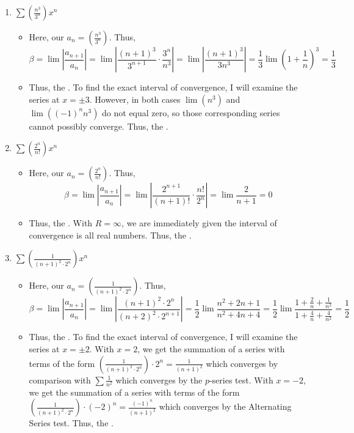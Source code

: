 \documentclass[10pt,a4paper]{article}
\theoremstyle{definition}
\begin{document}
\begin{enumerate}[label = (\alph*)]
\begin{itemize}
	\end{itemize}
\item $\displaystyle \sum \left(\frac{n^3}{3^n}\right)x^n$
	\begin{itemize}
	\item Here, our $\displaystyle a_n = \left(\frac{n^3}{3^n}\right)$. Thus,
	\[\beta = \lim \left|\frac{a_{n+1}}{a_n}\right| = \lim \left|\frac{(n + 1)^3}{3^{n+1}} \cdot \frac{3^n}{n^3}\right| = \lim \left|\frac{(n+1)^3}{3n^3}\right| = \frac{1}{3} \lim \left(1 + \frac{1}{n}\right)^3 = \frac{1}{3}	
	\]
	\item Thus, the . To find the exact interval of convergence, I will examine the series at $x = \pm 3$. However, in both cases $\lim(n^3)$ and $\lim((-1)^nn^3)$ do not equal zero, so those corresponding series cannot possibly converge. Thus, the .
	\end{itemize}
\item $\displaystyle \sum \left(\frac{2^n}{n!}\right)x^n$
	\begin{itemize}
	\item Here, our $\displaystyle a_n = \left(\frac{2^n}{n!}\right)$. Thus,
	\[\beta = \lim \left|\frac{a_{n+1}}{a_n}\right| = \lim \left|\frac{2^{n+1}}{(n+1)!} \cdot \frac{n!}{2^n}\right| = \lim \frac{2}{n+1} = 0\]
	\item Thus, the . With $R = \infty$, we are immediately given the interval of convergence is all real numbers. Thus, the .
	\end{itemize}
\item $\displaystyle \sum \left(\frac{1}{(n + 1)^2 \cdot 2^n}\right)x^n$
	\begin{itemize}
	\item Here, our $\displaystyle a_n = \left(\frac{1}{(n+1)^2\cdot 2^n}\right)$. Thus,
	\[\beta = \lim \left|\frac{a_{n+1}}{a_n}\right| = \lim \left|\frac{(n+1)^2 \cdot 2^n}{(n+2)^2 \cdot 2^{n+1}}\right| = \frac{1}{2} \lim \frac{n^2 + 2n + 1}{n^2 + 4n + 4} = \frac{1}{2} \lim \frac{1 + \frac{2}{n} + \frac{1}{n^2}}{1 + \frac{4}{n} + \frac{4}{n^2}} = \frac{1}{2}\]
	\item Thus, the . To find the exact interval of convergence, I will examine the series at $x = \pm 2$. With $x = 2$, we get the summation of a series with terms of the form $\displaystyle \left(\frac{1}{(n+1)^2 \cdot 2^n}\right)\cdot 2^n = \frac{1}{(n+1)^2}$ which converges by comparison with $\sum \frac{1}{n^2}$ which converges by the $p$-series test. With $x = -2$, we get the summation of a series with terms of the form $\displaystyle \left(\frac{1}{(n+1)^2 \cdot 2^n}\right)\cdot (-2)^n = \frac{(-1)^n}{(n+1)^2}$ which converges by the Alternating Series test. Thus, the .

\end{itemize}
\end{enumerate}
\end{document}
